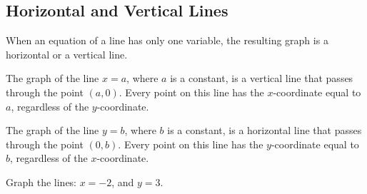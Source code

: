 \subsection{Horizontal and Vertical Lines}

When an equation of a line has only one variable, the resulting graph is a horizontal or a vertical line.

The graph of the line \(x = a\), where \(a\) is a constant, is a vertical line that passes through the point \((a, 0)\). Every point on this line has the \(x\)-coordinate equal to \(a\), regardless of the \(y\)-coordinate.

The graph of the line \(y = b\), where \(b\) is a constant, is a horizontal line that passes through the point \((0, b)\). Every point on this line has the \(y\)-coordinate equal to \(b\), regardless of the \(x\)-coordinate.

\begin{example}
Graph the lines: \(x = -2\), and \(y = 3\).
\end{example}

